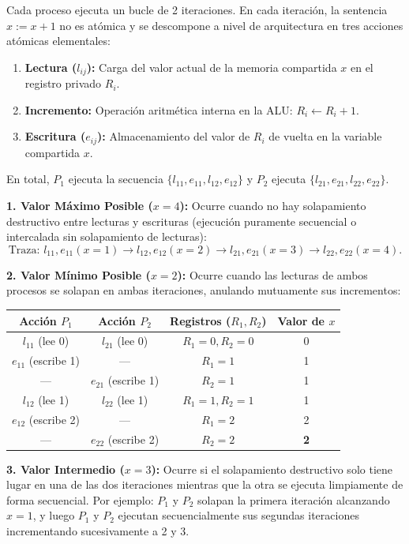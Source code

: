 \documentclass[11pt,a4paper,twoside,openright]{report}
\begin{document}
\begin{solucion}
Cada proceso ejecuta un bucle de 2 iteraciones. En cada iteración, la sentencia $x := x + 1$ no es atómica y se descompone a nivel de arquitectura en tres acciones atómicas elementales:
\begin{enumerate}
    \item \textbf{Lectura ($l_{ij}$):} Carga del valor actual de la memoria compartida $x$ en el registro privado $R_i$.
    \item \textbf{Incremento:} Operación aritmética interna en la ALU: $R_i \leftarrow R_i + 1$.
    \item \textbf{Escritura ($e_{ij}$):} Almacenamiento del valor de $R_i$ de vuelta en la variable compartida $x$.
\end{enumerate}
En total, $P_1$ ejecuta la secuencia $\{l_{11}, e_{11}, l_{12}, e_{12}\}$ y $P_2$ ejecuta $\{l_{21}, e_{21}, l_{22}, e_{22}\}$.

\textbf{1. Valor Máximo Posible ($x = 4$):}
Ocurre cuando no hay solapamiento destructivo entre lecturas y escrituras (ejecución puramente secuencial o intercalada sin solapamiento de lecturas):
\[
\text{Traza: } l_{11}, e_{11} (x=1) \to l_{12}, e_{12} (x=2) \to l_{21}, e_{21} (x=3) \to l_{22}, e_{22} (x=4).
\]

\textbf{2. Valor Mínimo Posible ($x = 2$):}
Ocurre cuando las lecturas de ambos procesos se solapan en ambas iteraciones, anulando mutuamente sus incrementos:
\begin{center}
\small
\begin{tabular}{cccc}
\toprule
\textbf{Acción $P_1$} & \textbf{Acción $P_2$} & \textbf{Registros ($R_1, R_2$)} & \textbf{Valor de $x$} \\ \midrule
$l_{11}$ (lee 0) & $l_{21}$ (lee 0) & $R_1=0, R_2=0$ & 0 \\
$e_{11}$ (escribe 1) & --- & $R_1=1$ & 1 \\
--- & $e_{21}$ (escribe 1) & $R_2=1$ & 1 \\
$l_{12}$ (lee 1) & $l_{22}$ (lee 1) & $R_1=1, R_2=1$ & 1 \\
$e_{12}$ (escribe 2) & --- & $R_1=2$ & 2 \\
--- & $e_{22}$ (escribe 2) & $R_2=2$ & \textbf{2} \\ \bottomrule
\end{tabular}
\end{center}

\textbf{3. Valor Intermedio ($x = 3$):}
Ocurre si el solapamiento destructivo solo tiene lugar en una de las dos iteraciones mientras que la otra se ejecuta limpiamente de forma secuencial. Por ejemplo: $P_1$ y $P_2$ solapan la primera iteración alcanzando $x = 1$, y luego $P_1$ y $P_2$ ejecutan secuencialmente sus segundas iteraciones incrementando sucesivamente a 2 y 3.


\end{solucion}
\end{document}
